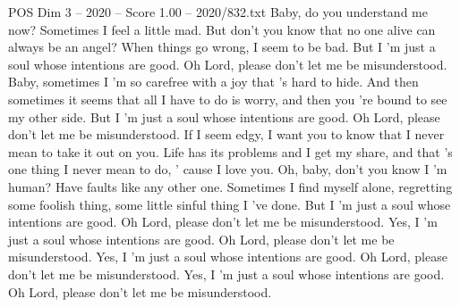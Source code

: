 \begin{textsample}{POS Dim 3 – 2020 – Score 1.00 – 2020/832.txt}  \label{ex:f3_pos_015}
Baby, do you understand me now?
Sometimes I feel a little mad.
But don't you know that no one alive can always be an angel?
When things go wrong, I seem to be bad.
But I 'm just a soul whose intentions are good.
Oh Lord, please don't let me be misunderstood.
Baby, sometimes I 'm so carefree with a joy that 's hard to hide.
And then sometimes it seems that all I have to do is worry, and then you 're bound to see my other side.
But I 'm just a soul whose intentions are good.
Oh Lord, please don't let me be misunderstood.
If I seem edgy, I want you to know that I never mean to take it out on you.
Life has its problems and I get my share, and that 's one thing I never mean to do, ' cause I love you.
Oh, baby, don't you know I 'm human?
Have faults like any other one.
Sometimes I find myself alone, regretting some foolish thing, some little sinful thing I 've done.
But I 'm just a soul whose intentions are good.
Oh Lord, please don't let me be misunderstood.
Yes, I 'm just a soul whose intentions are good.
Oh Lord, please don't let me be misunderstood.
Yes, I 'm just a soul whose intentions are good.
Oh Lord, please don't let me be misunderstood.
Yes, I 'm just a soul whose intentions are good.
Oh Lord, please don't let me be misunderstood.

\end{textsample}
